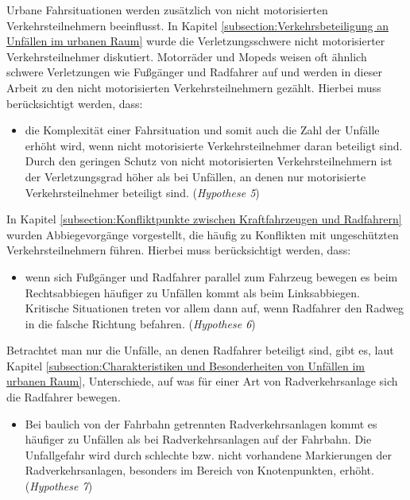 Urbane Fahrsituationen werden zusätzlich von nicht motorisierten Verkehrsteilnehmern beeinflusst. In Kapitel \ref{subsection:Verkehrsbeteiligung an Unfällen im urbanen Raum} wurde die Verletzungsschwere nicht motorisierter Verkehrsteilnehmer diskutiert. Motorräder und Mopeds weisen oft ähnlich schwere Verletzungen wie Fußgänger und Radfahrer auf und werden in dieser Arbeit zu den nicht motorisierten Verkehrsteilnehmern gezählt. Hierbei muss berücksichtigt werden, dass:
	
\begin{itemize}
	\item die Komplexität einer Fahrsituation und somit auch die Zahl der Unfälle erhöht wird, wenn nicht motorisierte Verkehrsteilnehmer daran beteiligt sind. Durch den geringen Schutz von nicht motorisierten Verkehrsteilnehmern ist der Verletzungsgrad höher als bei Unfällen, an denen nur motorisierte Verkehrsteilnehmer beteiligt sind. (\textit{Hypothese 5})
\end{itemize}

In Kapitel \ref{subsection:Konfliktpunkte zwischen Kraftfahrzeugen und Radfahrern} wurden Abbiegevorgänge vorgestellt, die häufig zu Konflikten mit ungeschützten Verkehrsteilnehmern führen. Hierbei muss berücksichtigt werden, dass:

\begin{itemize}
	\item wenn sich Fußgänger und Radfahrer parallel zum Fahrzeug bewegen es beim Rechtsabbiegen häufiger zu Unfällen kommt als beim Linksabbiegen. Kritische Situationen treten vor allem dann auf, wenn Radfahrer den Radweg in die falsche Richtung befahren. (\textit{Hypothese 6})
\end{itemize}	

Betrachtet man nur die Unfälle, an denen Radfahrer beteiligt sind, gibt es, laut Kapitel \ref{subsection:Charakteristiken und Besonderheiten von Unfällen im urbanen Raum}, Unterschiede, auf was für einer Art von Radverkehrsanlage sich die Radfahrer bewegen.
	
\begin{itemize}	
	\item Bei baulich von der Fahrbahn getrennten Radverkehrsanlagen kommt es häufiger zu Unfällen als bei Radverkehrsanlagen auf der Fahrbahn. Die Unfallgefahr wird durch schlechte bzw. nicht vorhandene Markierungen der Radverkehrsanlagen, besonders im Bereich von Knotenpunkten, erhöht. (\textit{Hypothese 7})
\end{itemize}	
	
